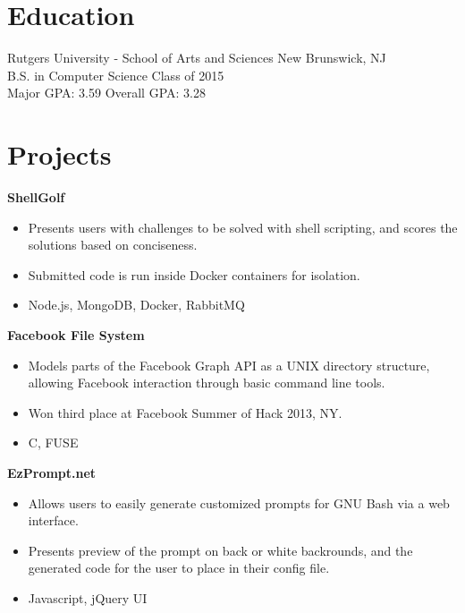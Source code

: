 \documentclass[centered,overlapped]{res}
\begin{document}
\begin{resume}
\section{Education}

Rutgers University - School of Arts and Sciences \hfill New Brunswick, NJ\\
B.S. in Computer Science \hfill Class of 2015 \\
Major GPA: 3.59 \hfill Overall GPA: 3.28




\section{Projects}

	{\bf ShellGolf}
  \begin{itemize} \itemsep -2pt %
    \item Presents users with challenges to be solved with shell scripting, and
      scores the solutions based on conciseness.
    \item Submitted code is run inside Docker containers for isolation.
    \item Node.js, MongoDB, Docker, RabbitMQ
  \end{itemize}

	{\bf Facebook File System}
  \begin{itemize} \itemsep -2pt %
    \item Models parts of the Facebook Graph API as a UNIX directory structure,
      allowing Facebook interaction through basic command line tools.
    \item Won third place at Facebook Summer of Hack 2013, NY.
    \item C, FUSE
  \end{itemize}

  {\bf EzPrompt.net}
  \begin{itemize} \itemsep -2pt %
    \item Allows users to easily generate customized prompts for GNU Bash via a
      web interface.
    \item Presents preview of the prompt on back or white backrounds, and the
      generated code for the user to place in their config file.
    \item Javascript, jQuery UI
  \end{itemize}


\end{resume}
\end{document}
